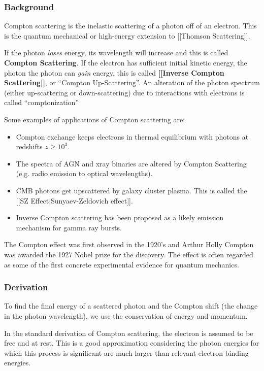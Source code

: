 \documentclass{article}
\begin{document}
\subsubsection{Background}

Compton scattering is the inelastic scattering of a photon off of an electron.  This is the quantum mechanical or high-energy extension to [[Thomson Scattering]].


If the photon {\it loses} energy, its wavelength will increase and this is called {\bf Compton Scattering}.  If the electron has sufficient initial kinetic energy, the photon the photon can {\it gain} energy, this is called {\bf [[Inverse Compton Scattering]]}, or ``Compton Up-Scattering''.  An alteration of the photon spectrum (either up-scattering or down-scattering) due to interactions with electrons is called ``comptonization''\par

Some examples of applications of Compton scattering are:
\begin{itemize}
\item  Compton exchange keeps electrons in thermal equilibrium with
photons at redshifts $z\ge10^3$.
\item  The spectra of AGN and xray binaries are altered by Compton
Scattering (e.g. radio emission to optical wavelengths).
\item  CMB photons get upscattered by galaxy cluster plasma.  This is
called the [[SZ Effect|Sunyaev-Zeldovich effect]].
\item Inverse Compton scattering has been proposed as a likely emission mechanism for gamma ray bursts.
\end{itemize}

The Compton effect was first observed in the 1920's and Arthur Holly Compton was awarded the 1927 Nobel prize for the discovery. The effect is often regarded as some of the first concrete experimental evidence for quantum mechanics. \par

\subsubsection{Derivation}

To find the final energy of a scattered photon and the Compton shift (the change in the photon wavelength), we use the conservation of energy and momentum.

In the standard derivation of Compton scattering, the electron is assumed to be free and at rest. This is a good approximation considering the photon energies for which this process is significant are much larger than relevant electron binding energies.
\end{document}

